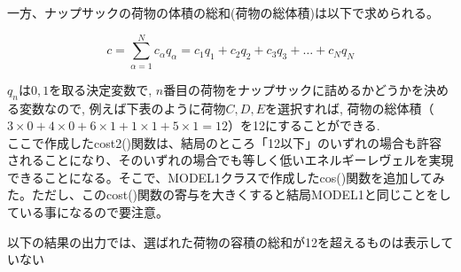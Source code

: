 \documentclass[uplatex,dvipdfmx,a4paper,11pt,oneside,openany]{jsbook}
\begin{document}
一方、ナップサックの荷物の体積の総和(荷物の総体積)は以下で求められる。

\[
c = \sum_{\alpha=1}^{N}c_\alpha q_\alpha = c_1 q_1 + c_2 q_2 + c_3 q_3 + \dots + c_N q_N
\]

$q_n$は$0,1$を取る決定変数で, $n$番目の荷物をナップサックに詰めるかどうかを決める変数なので, 例えば下表のように荷物$C,D,E$を選択すれば, 荷物の総体積（$3\times 0+4\times 0+6\times 1+1\times 1+5\times 1=12$）を12にすることができる.\\



ここで作成したcost2()関数は、結局のところ「12以下」のいずれの場合も許容されることになり、そのいずれの場合でも等しく低いエネルギーレヴェルを実現できることになる。そこで、MODEL1クラスで作成したcos()関数を追加してみた。ただし、このcost()関数の寄与を大きくすると結局MODEL1と同じことをしている事になるので要注意。

以下の結果の出力では、選ばれた荷物の容積の総和が12を超えるものは表示していない
\end{document}
